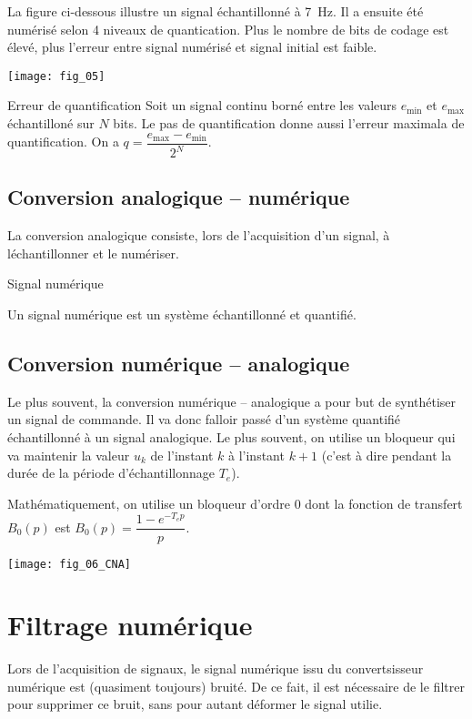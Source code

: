 La figure ci-dessous illustre un signal échantillonné à \SI{7}{Hz}. Il a ensuite été numérisé selon 4 niveaux de quantication. Plus le nombre de bits de codage est élevé, plus l'erreur entre signal numérisé et signal initial est faible.
 
\begin{center}
\texttt{[image: fig\_05]}
\end{center}


\begin{defi}{Erreur de quantification}
Soit un signal continu borné entre les valeurs $e_{\text{min}}$ et $e_{\text{max}}$ échantilloné sur $N$ bits. Le pas de quantification donne aussi l'erreur maximala de quantification. On a $q = \dfrac{e_{\text{max}}-e_{\text{min}}}{2^N}$.

\end{defi}


\subsection{Conversion analogique -- numérique}
La conversion analogique consiste, lors de l'acquisition d'un signal, à léchantillonner et le  numériser. 
\begin{defi}{Signal numérique}

Un signal numérique est un système échantillonné et quantifié. 

\end{defi}

\subsection{Conversion numérique -- analogique}
Le plus souvent, la conversion numérique -- analogique a pour but de synthétiser un signal de commande. Il va donc falloir passé d'un système quantifié échantillonné à un signal analogique. Le plus souvent, on utilise un bloqueur qui va maintenir la valeur $u_k$ de l'instant $k$ à l'instant $k+1$ (c'est à dire pendant la durée de la période d'échantillonnage $T_e$). 

Mathématiquement, on utilise un bloqueur d'ordre 0 dont la fonction de transfert $B_0(p)$ est $B_0(p)=\dfrac{1-e^{-T_e p}}{p}$.

\begin{center}
\texttt{[image: fig\_06\_CNA]}
\end{center}

\section{Filtrage numérique}
Lors de l'acquisition de signaux, le signal numérique issu du convertsisseur numérique est (quasiment toujours) bruité. 
De ce fait, il est nécessaire de le filtrer pour supprimer ce bruit, sans pour autant déformer le signal utilie. 

